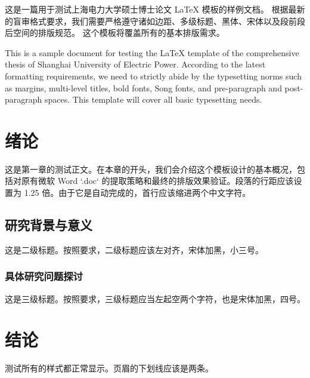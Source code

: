 \documentclass[degree=master,degreetype=professional]{suepthesis}
\begin{document}
\MakeTitle


\begin{cnabstract}
这是一篇用于测试上海电力大学硕士博士论文 LaTeX 模板的样例文档。
根据最新的盲审格式要求，我们需要严格遵守诸如边距、多级标题、黑体、宋体以及段前段后空间的排版规范。
这个模板将覆盖所有的基本排版需求。
\end{cnabstract}

\begin{enabstract}
This is a sample document for testing the LaTeX template of the comprehensive thesis of Shanghai University of Electric Power. 
According to the latest formatting requirements, we need to strictly abide by the typesetting norms such as margins, multi-level titles, bold fonts, Song fonts, and pre-paragraph and post-paragraph spaces.
This template will cover all basic typesetting needs.
\end{enabstract}

\tableofcontents

\clearpage
{}
\pagestyle{suep_header}

\section{绪论}
这是第一章的测试正文。在本章的开头，我们会介绍这个模板设计的基本概况，包括对原有微软 Word `.doc` 的提取策略和最终的排版效果验证。段落的行距应该设置为 1.25 倍。由于它是自动完成的，首行应该缩进两个中文字符。

\subsection{研究背景与意义}
这是二级标题。按照要求，二级标题应该左对齐，宋体加黑，小三号。

\subsubsection{具体研究问题探讨}
这是三级标题。按照要求，三级标题应当左起空两个字符，也是宋体加黑，四号。

\section{结论}
测试所有的样式都正常显示。页眉的下划线应该是两条。
\end{document}
